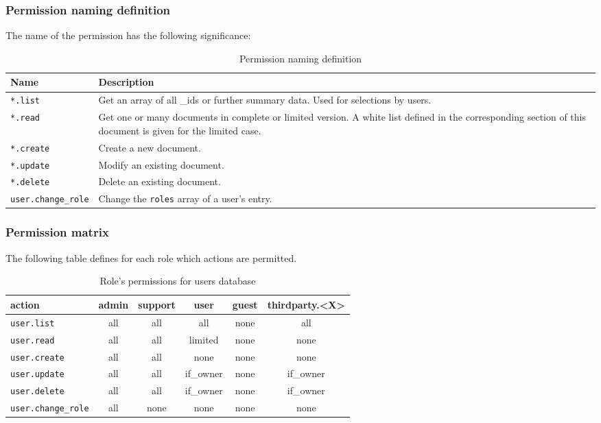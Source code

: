 \subsubsection{Permission naming definition}
The name of the permission has the following significance:
\begin{table}[htbp!]
\label{tab:protocoldef:permissionmatrix:permissionnamingdefinition}
  \begin{tabular}{|l|p{11cm}|} \hline
    Name                      & Description \\ \hline \hline
    \verb|*.list|             & Get an array of all \_ids or further summary data. Used for selections by users. \\
    \hline
    \verb|*.read|             & Get one or many documents in complete or limited version. A white list defined in the corresponding section of this document is given for the limited case. \\ \hline
    \verb|*.create|           & Create a new document. \\ \hline
    \verb|*.update|           & Modify an existing document. \\ \hline
    \verb|*.delete|           & Delete an existing document. \\ \hline
    \verb|user.change_role|   & Change the \verb|roles| array of a user's entry. \\ \hline
  \end{tabular}
  \caption{Permission naming definition}
\end{table}
\FloatBarrier

\subsubsection{Permission matrix}
\label{protocoldef:permissionmatrix}
The following table defines for each role which actions are permitted.

\begin{table}[htbp]
\label{tab:protocoldef:permissionmatrix:usersdb}
  \begin{tabular}{|l|c|c|c|c|c|} \hline
    action                  & admin & support & user      & guest & thirdparty.<X> \\ \hline \hline
    \verb|user.list|        & all   & all     & all       & none  & all       \\ \hline
    \verb|user.read|        & all   & all     & limited   & none  & none \\ \hline
    \verb|user.create|      & all   & all     & none      & none  & none      \\ \hline
    \verb|user.update|      & all   & all     & if\_owner & none  & if\_owner \\ \hline
    \verb|user.delete|      & all   & all     & if\_owner & none  & if\_owner \\ \hline
    \verb|user.change_role| & all   & none    & none      & none  & none      \\ \hline
  \end{tabular}
  \caption{Role's permissions for users database}
\end{table}


